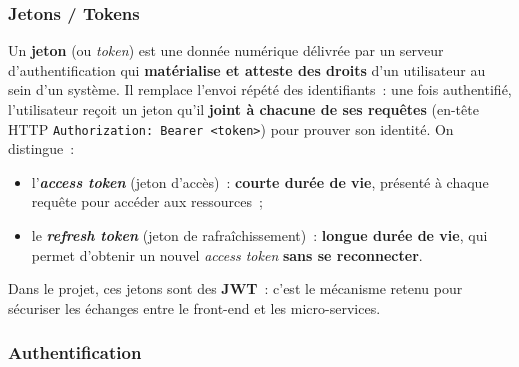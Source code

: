 \vspace{0.4cm}

\subsubsection*{Jetons / Tokens}
{}

\noindent Un \textbf{jeton} (ou \textit{token}) est une donnée numérique délivrée par un serveur d'authentification qui \textbf{matérialise et atteste des droits} d'un utilisateur au sein d'un système. Il remplace l'envoi répété des identifiants~: une fois authentifié, l'utilisateur reçoit un jeton qu'il \textbf{joint à chacune de ses requêtes} (en-tête HTTP \texttt{Authorization: Bearer <token>}) pour prouver son identité. On distingue~:
\begin{itemize}
	\item l'\textbf{\textit{access token}} (jeton d'accès)~: \textbf{courte durée de vie}, présenté à chaque requête pour accéder aux ressources~;
	\item le \textbf{\textit{refresh token}} (jeton de rafraîchissement)~: \textbf{longue durée de vie}, qui permet d'obtenir un nouvel \textit{access token} \textbf{sans se reconnecter}.
\end{itemize}
\noindent Dans le projet, ces jetons sont des \textbf{JWT}~: c'est le mécanisme retenu pour sécuriser les échanges entre le front-end et les micro-services.

\newpage

\subsubsection*{Authentification}
{}

